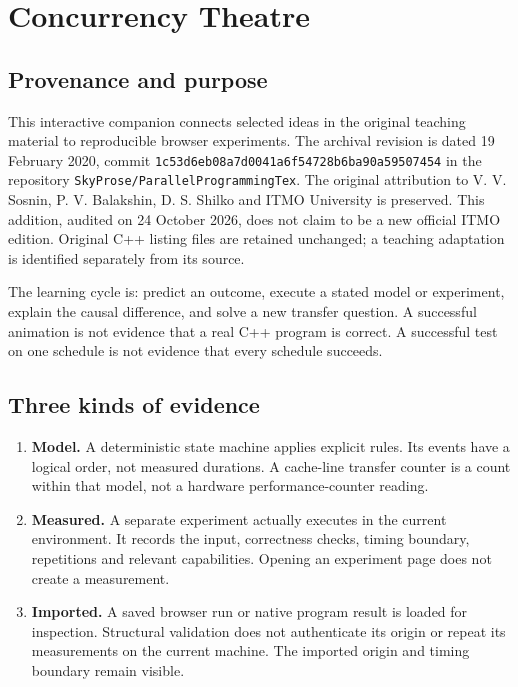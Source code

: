 { %
  \section{Concurrency Theatre}
  \label{concurrencyTheatre:section}

  \subsection{Provenance and purpose}

  \par This interactive companion connects selected ideas in the original teaching material to reproducible browser experiments. The archival revision is dated 19 February 2020, commit \texttt{1c53d6eb08a7d0041a6f54728b6ba90a59507454} in the repository \texttt{SkyProse/ParallelProgrammingTex}. The original attribution to V. V. Sosnin, P. V. Balakshin, D. S. Shilko and ITMO University is preserved. This addition, audited on 24 October 2026, does not claim to be a new official ITMO edition. Original C++ listing files are retained unchanged; a teaching adaptation is identified separately from its source.

  \par The learning cycle is: predict an outcome, execute a stated model or experiment, explain the causal difference, and solve a new transfer question. A successful animation is not evidence that a real C++ program is correct. A successful test on one schedule is not evidence that every schedule succeeds.

  \subsection{Three kinds of evidence}

  \begin{enumerate}
    \item \textbf{Model.} A deterministic state machine applies explicit rules. Its events have a logical order, not measured durations. A cache-line transfer counter is a count within that model, not a hardware performance-counter reading.
    \item \textbf{Measured.} A separate experiment actually executes in the current environment. It records the input, correctness checks, timing boundary, repetitions and relevant capabilities. Opening an experiment page does not create a measurement.
    \item \textbf{Imported.} A saved browser run or native program result is loaded for inspection. Structural validation does not authenticate its origin or repeat its measurements on the current machine. The imported origin and timing boundary remain visible.
  \end{enumerate}

}
